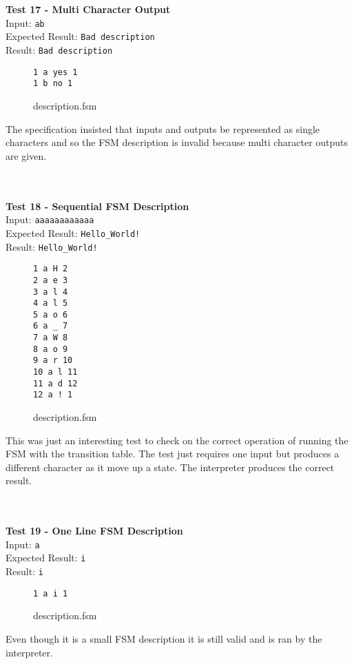 \documentclass{article}
\begin{document}
\noindent \\ \\ \textbf{Test 17 - Multi Character Output} \\
\noindent Input: \verb+ab+ \\
Expected Result: \verb+Bad description+ \\
Result: \verb+Bad description+ \\
\begin{figure}[H]
\center
\begin{BVerbatim}
1 a yes 1
1 b no 1
\end{BVerbatim}
\caption{description.fsm}
\end{figure}
\noindent The specification insisted that inputs and outputs be represented as single characters and so the FSM description is invalid because multi character outputs are given.

\noindent \\ \\ \textbf{Test 18 - Sequential FSM Description} \\
\noindent Input: \verb+aaaaaaaaaaaa+ \\
Expected Result: \verb+Hello_World!+ \\
Result: \verb+Hello_World!+ \\
\begin{figure}[H]
\center
\begin{BVerbatim}
1 a H 2
2 a e 3
3 a l 4
4 a l 5
5 a o 6
6 a _ 7
7 a W 8
8 a o 9
9 a r 10
10 a l 11
11 a d 12
12 a ! 1
\end{BVerbatim}
\caption{description.fsm}
\end{figure}
\noindent This was just an interesting test to check on the correct operation of running the FSM with the transition table. The test just requires one input but produces a different character as it move up a state. The interpreter produces the correct result.

\noindent \\ \\ \textbf{Test 19 - One Line FSM Description} \\
\noindent Input: \verb+a+ \\
Expected Result: \verb+i+ \\
Result: \verb+i+ \\
\begin{figure}[H]
\center
\begin{BVerbatim}
1 a i 1
\end{BVerbatim}
\caption{description.fsm}
\end{figure}
\noindent Even though it is a small FSM description it is still valid and is ran by the interpreter.
\end{document}
